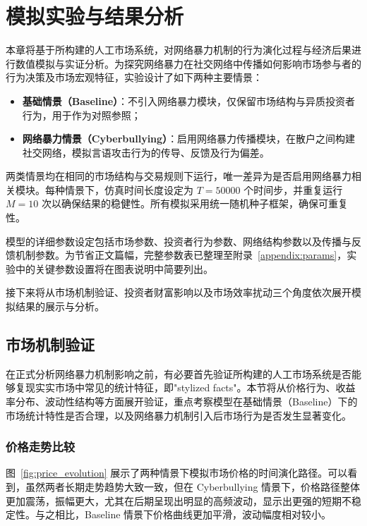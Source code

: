 \chapter{模拟实验与结果分析}
本章将基于所构建的人工市场系统，对网络暴力机制的行为演化过程与经济后果进行数值模拟与实证分析。为探究网络暴力在社交网络中传播如何影响市场参与者的行为决策及市场宏观特征，实验设计了如下两种主要情景：

\begin{itemize}
  \item \textbf{基础情景（Baseline）}：不引入网络暴力模块，仅保留市场结构与异质投资者行为，用于作为对照参照；
  \item \textbf{网络暴力情景（Cyberbullying）}：启用网络暴力传播模块，在散户之间构建社交网络，模拟言语攻击行为的传导、反馈及行为偏差。
\end{itemize}

两类情景均在相同的市场结构与交易规则下运行，唯一差异为是否启用网络暴力相关模块。每种情景下，仿真时间长度设定为 \( T = 50000 \) 个时间步，并重复运行 \( M = 10 \) 次以确保结果的稳健性。所有模拟采用统一随机种子框架，确保可重复性。

模型的详细参数设定包括市场参数、投资者行为参数、网络结构参数以及传播与反馈机制参数。为节省正文篇幅，完整参数表已整理至附录~\ref{appendix:params}，实验中的关键参数设置将在图表说明中简要列出。

接下来将从市场机制验证、投资者财富影响以及市场效率扰动三个角度依次展开模拟结果的展示与分析。   


\section{市场机制验证}

在正式分析网络暴力机制影响之前，有必要首先验证所构建的人工市场系统是否能够复现实实市场中常见的统计特征，即"stylized facts"。本节将从价格行为、收益率分布、波动性结构等方面展开验证，重点考察模型在基础情景（Baseline）下的市场统计特性是否合理，以及网络暴力机制引入后市场行为是否发生显著变化。

\subsection{价格走势比较}

图~\ref{fig:price_evolution} 展示了两种情景下模拟市场价格的时间演化路径。可以看到，虽然两者长期走势趋势大致一致，但在 Cyberbullying 情景下，价格路径整体更加震荡，振幅更大，尤其在后期呈现出明显的高频波动，显示出更强的短期不稳定性。与之相比，Baseline 情景下价格曲线更加平滑，波动幅度相对较小。

